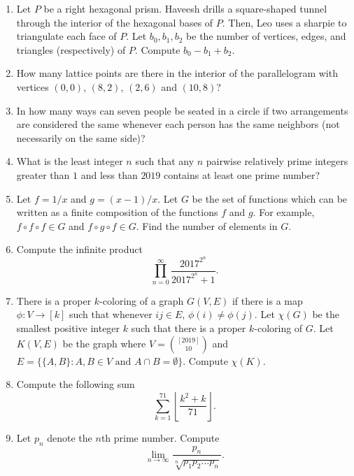 \documentclass[12pt]{article}
\begin{document}
\begin{multicols}{2}
\begin{enumerate} 

\item Let $P$ be a right hexagonal prism. Haveesh drills a square-shaped tunnel through the interior of the hexagonal bases of $P$. Then, Leo uses a sharpie to triangulate each face of $P$. Let $b_0, b_1, b_2$ be the number of vertices, edges, and triangles (respectively) of $P$. Compute $b_0 - b_1 + b_2$.

\item How many lattice points are there in the interior of the parallelogram with vertices $(0, 0)$, $(8, 2)$, $(2, 6)$ and $(10, 8)$?

\item In how many ways can seven people be seated in a circle if two arrangements are considered the same whenever each person has the same neighbors (not necessarily on the same side)? 

\item What is the least integer $n$ such that any $n$ pairwise relatively prime integers greater than $1$ and less than $2019$ contains at least one prime number?

\item Let $f = 1/x$ and $g = (x-1)/x$. Let $G$ be the set of functions which can be written as a finite composition of the functions $f$ and $g$. For example, $f \circ f \circ f \in G$ and $f \circ g \circ f \in G$. Find the number of elements in $G$. 

\item Compute the infinite product
\[
    \prod_{n = 0}^{\infty} \frac{2017^{2^n}}{2017^{2^n} + 1}.
\]

\item There is a proper $k$-coloring of a graph $G(V, E)$ if there is a map $\phi : V \to [k]$ such that whenever $ij \in E$, $\phi(i) \neq \phi(j)$. Let $\chi(G)$ be the smallest positive integer $k$ such that there is a proper $k$-coloring of $G$. Let $K(V, E)$ be the graph where $V = \binom{[2019]}{10}$ and $E = \{\{A, B\} : A, B \in V \text{ and } A \cap B = \emptyset \}.$ Compute $\chi(K)$. 

\item Compute the following sum
\[
    \sum_{k = 1}^{71} \left \lfloor \frac{k^2+k}{71} \right \rfloor.
\]

\item Let $p_n$ denote the $n$th prime number. Compute
\[
    \lim_{n \to \infty} \frac{p_n}{\sqrt[n]{p_1p_2...p_n}}.
\]


\end{enumerate}
\end{multicols}
\end{document}
